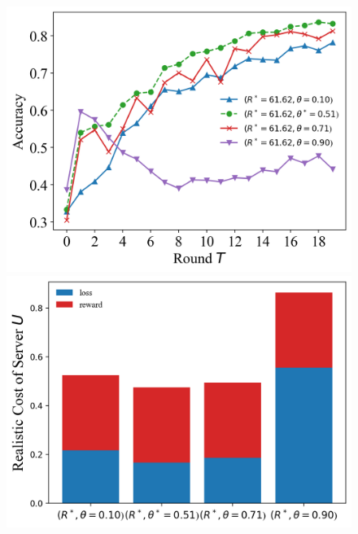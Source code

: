 \documentclass{article}
\theoremstyle{plain}
\theoremstyle{definition}
\theoremstyle{remark}
\begin{document}
\begin{figure}
	\begin{minipage}{0.49\linewidth}
		\centerline{\includegraphics[width=\textwidth]{figures/figure_65_B.png}}
	\end{minipage}
	\begin{minipage}{0.49\linewidth}
		\centerline{\includegraphics[width=\textwidth]{figures/figure_66_B.png}}
	\end{minipage}
	\begin{minipage}{0.49\linewidth}

\end{minipage}
\end{figure}
\end{document}
